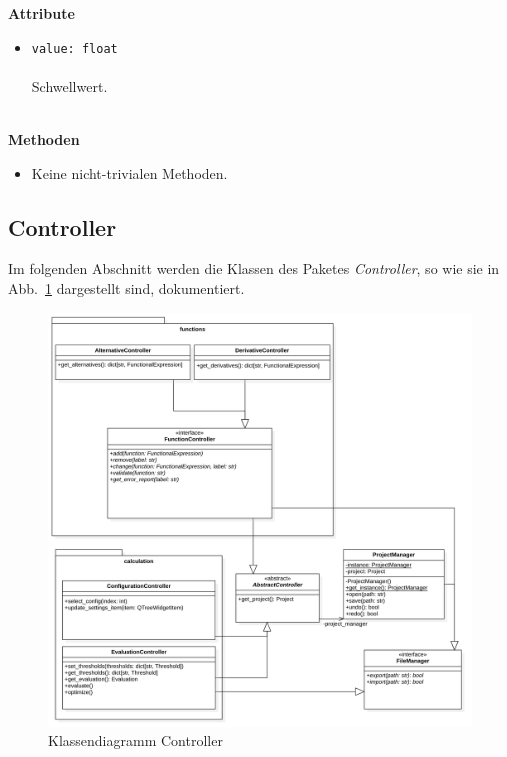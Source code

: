 \documentclass{article}
\begin{document}
\textbf{Attribute}
\begin{itemize}\setlength\itemsep{3em}
\item \texttt{value: float}\\\\
Schwellwert.
\\\\
\end{itemize}

\textbf{Methoden}
\begin{itemize}\setlength\itemsep{3em}
\item[] Keine nicht-trivialen Methoden.
\end{itemize}
\newpage
\subsection{Controller}

Im folgenden Abschnitt werden die Klassen des Paketes \emph{Controller}, so wie sie in Abb.~\ref{fig:ControllerKlassendiagramm} dargestellt sind, dokumentiert.

\begin{figure}[H]%
    \centering
    \includegraphics[width=13cm]{entwurf/Floriane/ControllerKlassendiagramm.png}
    \caption{Klassendiagramm Controller}
    \label{fig:ControllerKlassendiagramm}
\end{figure}
\end{document}
